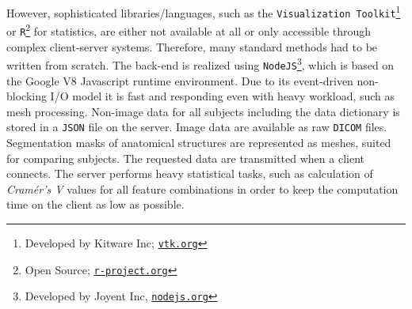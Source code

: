 \documentclass[journal]{style/vgtc} 			          %
\newcommand{\rem}[1]{\textcolor{red}{\sout{#1}}}
\begin{document}
%
However, sophisticated libraries/languages, such as the \texttt{Visualization Toolkit}\footnote{Developed by Kitware Inc; \href{http://vtk.org}{\texttt{vtk.org}}} or \texttt{R}\footnote{Open Source; \href{http://r-project.org}{\texttt{r-project.org}}} for statistics, are either not available at all or only accessible through complex client-server systems.
%
Therefore, many standard methods had to be written from scratch.
%
%
%
The back-end is realized using \texttt{NodeJS}\footnote{Developed by Joyent Inc, \href{http://nodejs.org}{\texttt{nodejs.org}}}, which is based on the Google V8 Javascript runtime environment.
%
Due to its event-driven non-blocking I/O model it is fast and responding even with heavy workload, such as mesh processing.
%
Non-image data for all subjects including the data dictionary is stored in a \texttt{JSON} file on the server.
%
Image data are available as raw \texttt{DICOM} files.
%
Segmentation masks of anatomical structures are represented as meshes, suited for comparing subjects.
%
The requested data are transmitted when a client connects.
%
The server performs heavy statistical tasks, such as calculation of \emph{Cram\'{e}r's V} values for all feature combinations in order to keep the computation time on the client as low as possible.
%
\end{document}
